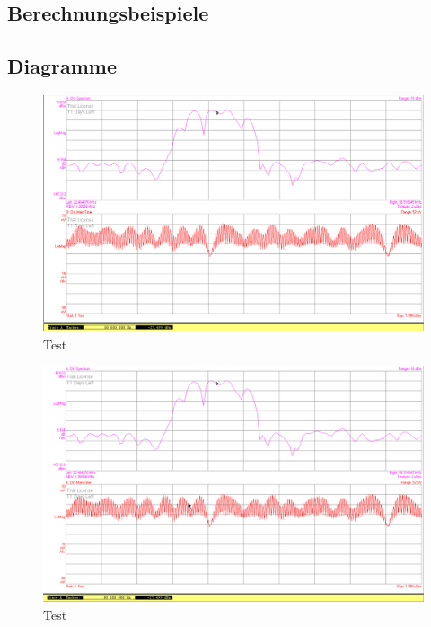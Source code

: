 \documentclass[12pt,a4paper,ngerman]{article}
\begin{document}
\subsection{Berechnungsbeispiele}

\subsection{Diagramme}
\begin{figure}[H]
\centering
\includegraphics[width=\textwidth]{figures/Aufgabe1_QPSK.jpg} 
\caption{Test}
\end{figure}

\begin{figure}[H]
\centering
\includegraphics[width=\textwidth]{figures/Aufgabe1_QPSK_.jpg} 
\caption{Test}
\end{figure}
\end{document}
